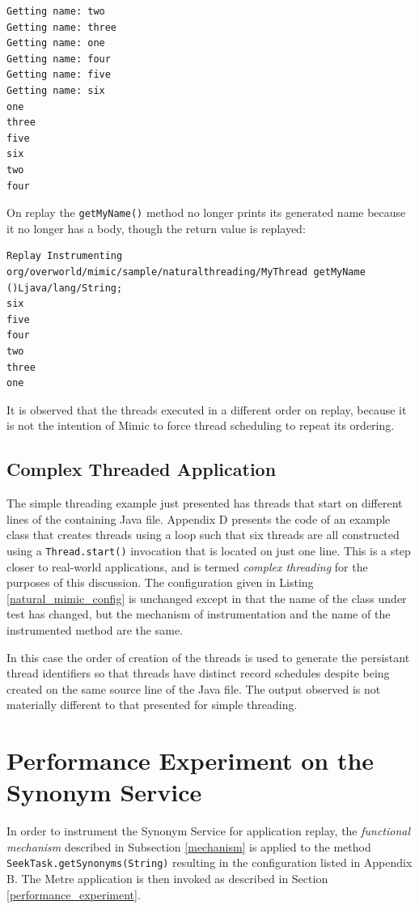 \documentclass[]{final_report}
\begin{document}
\begin{lstlisting}
Getting name: two
Getting name: three
Getting name: one
Getting name: four
Getting name: five
Getting name: six
one
three
five
six
two
four
\end{lstlisting}

On replay the \lstinline{getMyName()}\noop{} method no longer prints its generated name because it no longer has a body, though the return value is replayed:

\begin{lstlisting}
Replay Instrumenting org/overworld/mimic/sample/naturalthreading/MyThread getMyName ()Ljava/lang/String;
six
five
four
two
three
one
\end{lstlisting}

It is observed that the threads executed in a different order on replay, because it is not the intention of Mimic to force thread scheduling to repeat its ordering.

\subsection*{Complex Threaded Application \label{complex_threading}}

The simple threading example just presented has threads that start on different lines of the containing Java file. Appendix D presents the code of an example class that creates threads using a loop such that six threads are all constructed using a \lstinline{Thread.start()}\noop{} invocation that is located on just one line. This is a step closer to real-world applications, and is termed \textit{complex threading} for the purposes of this discussion. The configuration given in Listing \ref{natural_mimic_config} is unchanged except in that the name of the class under test has changed, but the mechanism of instrumentation and the name of the instrumented method are the same.

In this case the order of creation of the threads is used to generate the persistant thread identifiers so that threads have distinct record schedules despite being created on the same source line of the Java file. The output observed is not materially different to that presented for simple threading.

\section*{Performance Experiment on the Synonym Service}
In order to instrument the Synonym Service for application replay, the \textit{functional mechanism} described in Subsection \ref{mechanism} is applied to the method \lstinline{SeekTask.getSynonyms(String)} \noop{} resulting in the configuration listed in Appendix B. The Metre application is then invoked as described in Section \ref{performance_experiment}.
\end{document}
